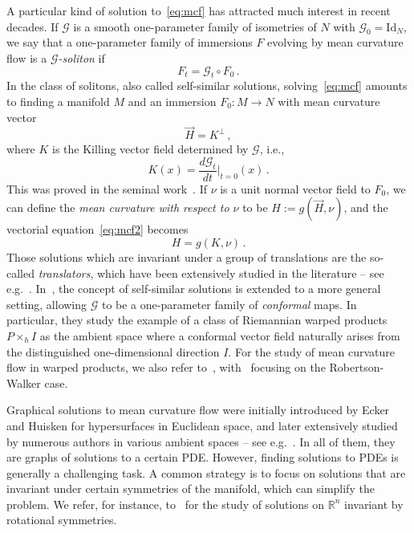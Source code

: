 \documentclass[oneside,12pt]{amsart}
\theoremstyle{definition}
\begin{document}
A particular kind of solution to~\eqref{eq:mcf} has attracted much interest in recent decades. If $\mathcal{G}$ is a smooth one-parameter family of isometries of $N$ with $\mathcal{G}_0 = \mathrm{Id}_N$, we say that a one-parameter family of immersions $F$ evolving by mean curvature flow is a \emph{$\mathcal{G}$-soliton} if
\begin{equation*}
F_t = \mathcal{G}_t \circ F_0 \, .
\end{equation*}
In the class of solitons, also called self-similar solutions, solving~\eqref{eq:mcf} amounts to finding a manifold $M$ and an immersion $F_0 \colon M \to N$ with mean curvature vector  
\begin{equation}\label{eq:mcf2}
    \vec{H} = K^{\perp} \, ,
\end{equation}
where $K$ is the Killing vector field determined by $\mathcal{G}$, i.e., 
\begin{equation} \label{eq:def_K}
    K(x) = \frac{d \mathcal{G}_t}{dt}\big\rvert_{t=0} (x) \, .
\end{equation}
This was proved in the seminal work~\cite{HS00}. If $\nu$ is a unit normal vector field to $F_0$, we can define the \emph{mean curvature with respect to $\nu$} to be $H := g \left( \vec{H} , \nu \right)$, and the vectorial equation~\eqref{eq:mcf2} becomes
\begin{equation}\label{eq:mcf3}
    H = g \left( K , \nu \right) \, .
\end{equation}
Those solutions which are invariant under a group of translations are the so-called \emph{translators}, which have been extensively studied in the literature -- see e.g.~\cite{CSS, LTW, MSHS}. In~\cite{ALR}, the concept of self-similar solutions is extended to a more general setting, allowing $\mathcal{G}$ to be a one-parameter family of \emph{conformal} maps. In particular, they study the example of a class of Riemannian warped products $P \times_h I$ as the ambient space where a conformal vector field naturally arises from the distinguished one-dimensional direction $I$. For the study of mean curvature flow in warped products, we also refer to~\cite{CMR, DS}, with~\cite{ALO} focusing on the Robertson-Walker case.

Graphical solutions to mean curvature flow were initially introduced by Ecker and Huisken \cite{H} for hypersurfaces in Euclidean space, and later extensively studied by numerous authors in various ambient spaces -- see e.g.~\cite{CSS, HIMW, LO, LM}. In all of them, they are graphs of solutions to a certain PDE. However, finding solutions to PDEs is generally a challenging task. A common strategy is to focus on solutions that are invariant under certain symmetries of the manifold, which can simplify the problem. We refer, for instance, to~\cite{CSS} for the study of solutions on $\mathbb{R}^n$ invariant by rotational symmetries. 
\end{document}
